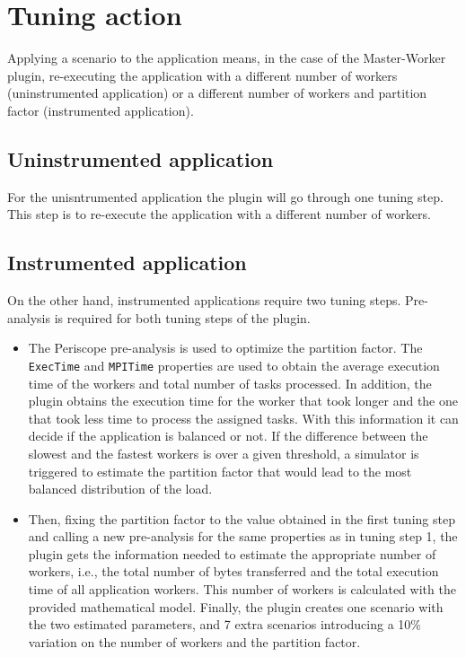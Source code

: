 \documentclass[11pt,a4paper, oneside]{book} %
\begin{document}
\section{Tuning action}
Applying a scenario to the application means, in the case of the Master-Worker plugin, re-executing the application with a different number of workers (uninstrumented application) or a different number of workers and partition factor (instrumented application).

\subsection{Uninstrumented application}
For the unisntrumented application the plugin will go through one tuning step.
This step is to re-execute the application with a different number of workers.

\subsection{Instrumented application}
On the other hand, instrumented applications require two tuning steps.
Pre-analysis is required for both tuning steps of the plugin.

\begin{itemize}
\item The Periscope pre-analysis is used to optimize the partition factor.
    The {\tt ExecTime} and {\tt MPITime} properties are used to obtain the
    average execution time of the workers and total number of tasks
    processed. In addition, the plugin obtains the execution time for the
    worker that took longer and the one that took less time to process the
    assigned tasks. With this information it can decide if the application
    is balanced or not. If the difference between the slowest and the
    fastest workers is over a given threshold, a simulator is triggered to
    estimate the  partition factor that would lead to the most balanced
    distribution of the load.
\item Then, fixing the partition factor to the value obtained in the first
    tuning step and calling a new pre-analysis for the same properties as
    in tuning step 1, the plugin gets the information needed to estimate
    the appropriate number of workers, i.e., the total number of bytes
    transferred and the total execution time of all application workers.
    This number of workers is calculated with the provided mathematical
    model. Finally, the plugin creates one scenario with the two estimated
    parameters, and 7 extra scenarios introducing a 10\% variation on
    the number of workers and the partition factor.
\end{itemize}
\end{document}
